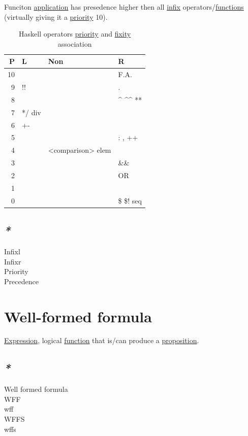 \documentclass[a4paper,14pt,oneside]{book}
\begin{document}
Funciton \hyperref[org5c027e8]{application} has presedence higher then all \hyperref[orgd49067c]{infix} operators/\hyperref[org0bd6046]{functions} (virtually giving it a \hyperref[orgc30d778]{priority} 10).\\

\begin{table}[htbp]
\caption{\label{tab:haskell-operator-priority-fixity-association}Haskell operators \hyperref[orgc30d778]{priority} and \hyperref[orgf771aee]{fixity} association}
\centering
\begin{tabular}{rlll}
P & L & Non & R\\
\hline
10 &  &  & F.A.\\
9 & !! &  & .\\
8 &  &  & \^{} \^{}\^{} **\\
7 & */ div &  & \\
6 & +- &  & \\
5 &  &  & : , ++\\
4 &  & <comparison> elem & \\
3 &  &  & \&\&\\
2 &  &  & OR\\
1 &  &  & \\
0 &  &  & \$ \$! seq\\
\end{tabular}
\end{table}

\subsection{\emph{*}}
\label{sec:org77a1ea0}

\label{orga88f486}Infixl\\
\label{orge66b861}Infixr\\
\label{orgc30d778}Priority\\
\label{org727d14d}Precedence\\

\section{\label{org216988d}Well-formed formula}
\label{sec:org6cb7b5a}
\hyperref[org6aa6989]{Expression}, logical \hyperref[org8cc2ae4]{function} that is/can produce a \hyperref[org19a0c89]{proposition}.\\

\subsection{\emph{*}}
\label{sec:orgdcd5a9c}
\label{org391e54c}Well formed formula\\
\label{org1f143d0}WFF\\
\label{org199a0ab}wff\\
\label{orgac957e8}WFFS\\
\label{orgdaa6470}wffs\\
\end{document}
